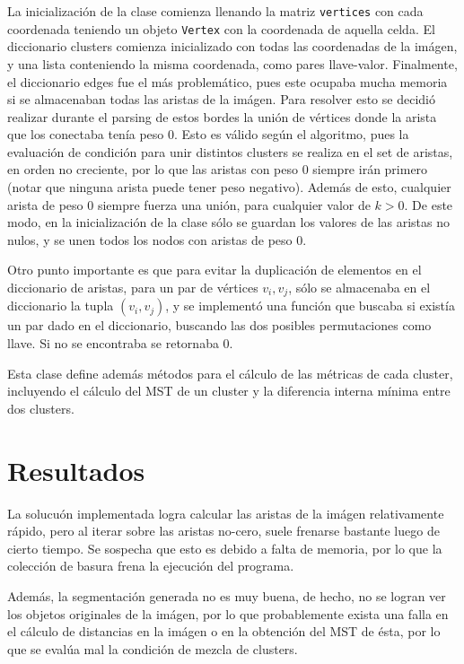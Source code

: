 \documentclass[letterpaper,11pt]{article} %
\begin{document}
  La inicialización de la clase comienza llenando la matriz \texttt{vertices} con cada coordenada teniendo un objeto \texttt{Vertex} con la coordenada de aquella celda. El diccionario clusters comienza inicializado con todas las coordenadas de la imágen, y una lista conteniendo la misma coordenada, como pares llave-valor. Finalmente, el diccionario edges fue el más problemático, pues este ocupaba mucha memoria si se almacenaban todas las aristas de la imágen. Para resolver esto se decidió realizar durante el parsing de estos bordes la unión de vértices donde la arista que los conectaba tenía peso 0. Esto es válido según el algoritmo, pues la evaluación de condición para unir distintos clusters se realiza en el set de aristas, en orden no creciente, por lo que las aristas con peso 0 siempre irán primero (notar que ninguna arista puede tener peso negativo). Además de esto, cualquier arista de peso 0 siempre fuerza una unión, para cualquier valor de $k > 0$. De este modo, en la inicialización de la clase sólo se guardan los valores de las aristas no nulos, y se unen todos los nodos con aristas de peso 0.

  Otro punto importante es que para evitar la duplicación de elementos en el diccionario de aristas, para un par de vértices $v_i, v_j$, sólo se almacenaba en el diccionario la tupla $(v_i, v_j)$, y se implementó una función que buscaba si existía un par dado en el diccionario, buscando las dos posibles permutaciones como llave. Si no se encontraba se retornaba 0.

  Esta clase define además métodos para el cálculo de las métricas de cada cluster, incluyendo el cálculo del MST de un cluster y la diferencia interna mínima entre dos clusters.
  
\section{Resultados}
  La solucuón implementada logra calcular las aristas de la imágen relativamente rápido, pero al iterar sobre las aristas no-cero, suele frenarse bastante luego de cierto tiempo. Se sospecha que esto es debido a falta de memoria, por lo que la colección de basura frena la ejecución del programa.

  Además, la segmentación generada no es muy buena, de hecho, no se logran ver los objetos originales de la imágen, por lo que probablemente exista una falla en el cálculo de distancias en la imágen o en la obtención del MST de ésta, por lo que se evalúa mal la condición de mezcla de clusters.
\end{document}
